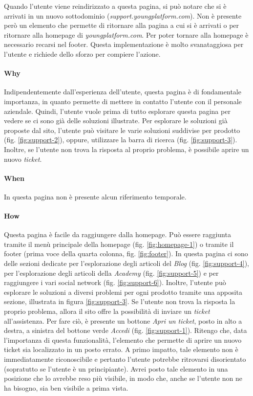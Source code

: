 Quando l'utente viene reindirizzato a questa pagina, si può notare che si 
è arrivati in un nuovo sottodominio (\textit{support.youngplatform.com}). 
Non è presente però un elemento che permette di ritornare alla pagina a cui 
si è arrivati o per ritornare alla homepage di \textit{youngplatform.com}. 
Per poter tornare alla homepage è necessario recarsi nel footer. Questa 
implementazione è molto svanataggiosa per l'utente e richiede dello sforzo 
per compiere l'azione.

\paragraph{Why}

Indipendentemente dall'esperienza dell'utente, questa pagina è di 
fondamentale importanza, in quanto permette di mettere in contatto 
l'utente con il personale aziendale. Quindi, l'utente vuole prima di 
tutto esplorare questa pagina per vedere se ci sono già delle soluzioni 
illustrate. Per esplorare le soluzioni già proposte dal sito, l'utente 
può visitare le varie soluzioni suddivise per prodotto 
(fig. \ref{fig:support-2}), oppure, utilizzare la barra di ricerca 
(fig. \ref{fig:support-3}). Inoltre, se l'utente non trova la risposta al 
proprio problema, è possibile aprire un nuovo \textit{ticket}.

\paragraph{When}

In questa pagina non è presente alcun riferimento temporale.

\paragraph{How}

Questa pagina è facile da raggiungere dalla homepage. Può essere 
raggiunta tramite il menù principale della homepage 
(fig. \ref{fig:homepage-1}) o tramite il footer (prima voce della quarta 
colonna, fig. \ref{fig:footer}). In questa pagina ci sono delle sezioni 
dedicate per l'esplorazione degli articoli del \textit{Blog} 
(fig. \ref{fig:support-4}), per l'esplorazione degli articoli della 
\textit{Academy} (fig. \ref{fig:support-5}) e per raggiungere i vari 
social network (fig. \ref{fig:support-6}). Inoltre, l'utente può 
esplorare le soluzioni a diversi problemi per ogni prodotto tramite 
una apposita sezione, illustrata in figura \ref{fig:support-3}. Se l'utente 
non trova la risposta la proprio problema, allora il sito offre la 
possibilità di inviare un \textit{ticket} all'assistenza. Per fare ciò, è 
presente un bottone \textit{Apri un ticket}, posto in alto a destra, a 
sinistra del bottone verde \textit{Accedi} (fig. \ref{fig:support-1}). 
Ritengo che, data l'importanza di questa funzionalità, l'elemento che 
permette di aprire un nuovo ticket sia localizzato in un posto errato. 
A primo impatto, tale elemento non è immediatamente riconoscibile e 
pertanto l'utente potrebbe ritrovarsi disorientato (sopratutto se l'utente 
è un principiante). Avrei posto tale elemento in una posizione che lo 
avrebbe reso più visibile, in modo che, anche se l'utente non ne ha 
bisogno, sia ben visibile a prima vista. 